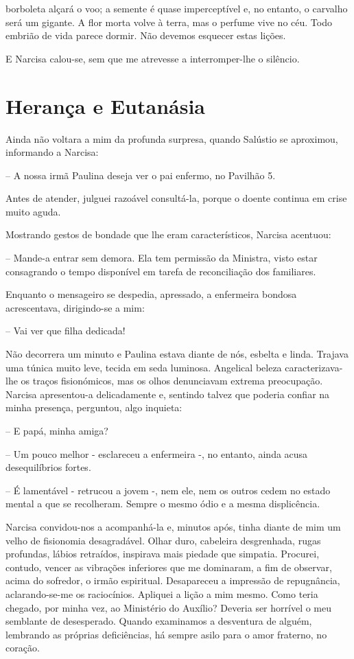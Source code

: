 \documentclass[portuguese,12pt,a4paper]{scrbook}
\begin{document}
	
	borboleta alçará o voo; a semente é quase imperceptível e, no entanto, o carvalho será um gigante. A flor morta volve à terra, mas o perfume vive no céu. Todo embrião de vida parece dormir. Não devemos esquecer estas lições.
	
	E Narcisa calou-se, sem que me atrevesse a interromper-lhe o silêncio.
	
	
	\chapter{Herança e Eutanásia}
	
	Ainda não voltara a mim da profunda surpresa, quando Salústio se aproximou, informando a Narcisa:
	
	– A nossa irmã Paulina deseja ver o pai enfermo, no Pavilhão 5.
	
	Antes de atender, julguei razoável consultá-la, porque o doente continua em crise muito aguda.
	
	Mostrando gestos de bondade que lhe eram característicos, Narcisa acentuou:
	
	– Mande-a entrar sem demora. Ela tem permissão da Ministra, visto estar consagrando o tempo disponível em tarefa de reconciliação dos familiares.
	
	Enquanto o mensageiro se despedia, apressado, a enfermeira bondosa acrescentava, dirigindo-se a mim:
	
	– Vai ver que filha dedicada!
	
	Não decorrera um minuto e Paulina estava diante de nós, esbelta e linda. Trajava uma túnica muito leve, tecida em seda luminosa. Angelical beleza caracterizava-lhe os traços fisionómicos, mas os olhos denunciavam extrema preocupação. Narcisa apresentou-a delicadamente e, sentindo talvez que poderia confiar na minha presença, perguntou, algo inquieta:
	
	– E papá, minha amiga?
	
	– Um pouco melhor - esclareceu a enfermeira -, no entanto, ainda acusa desequilíbrios fortes.
	
	– É lamentável - retrucou a jovem -, nem ele, nem os outros cedem no estado mental a que se recolheram. Sempre o mesmo ódio e a mesma displicência.
	
	
	Narcisa convidou-nos a acompanhá-la e, minutos após, tinha diante de mim um velho de fisionomia desagradável. Olhar duro, cabeleira desgrenhada, rugas profundas, lábios retraídos, inspirava mais piedade que simpatia. Procurei, contudo, vencer as vibrações inferiores que me dominaram, a fim de observar, acima do sofredor, o irmão espiritual. Desapareceu a impressão de repugnância, aclarando-se-me os raciocínios. Apliquei a lição a mim mesmo. Como teria chegado, por minha vez, ao Ministério do Auxílio? Deveria ser horrível o meu semblante de desesperado. Quando examinamos a desventura de alguém, lembrando as próprias deficiências, há sempre asilo para o amor fraterno, no coração.
	
\end{document}
